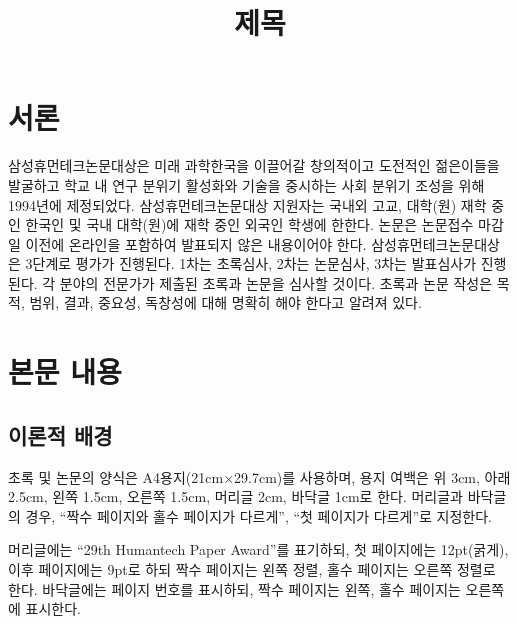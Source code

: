 \documentclass[kor]{humantech}
\title{제목} %
\begin{document}

\section{서론}
삼성휴먼테크논문대상은 미래 과학한국을 이끌어갈 창의적이고 도전적인 젊은이들을 발굴하고 학교 내 연구 분위기 활성화와 기술을 중시하는 사회 분위기 조성을 위해 1994년에 제정되었다. 삼성휴먼테크논문대상 지원자는 국내외 고교, 대학(원) 재학 중인 한국인 및 국내 대학(원)에 재학 중인 외국인 학생에 한한다. 논문은 논문접수 마감일 이전에 온라인을 포함하여 발표되지 않은 내용이어야 한다. 삼성휴먼테크논문대상은 3단계로 평가가 진행된다. 1차는 초록심사, 2차는 논문심사, 3차는 발표심사가 진행된다. 각 분야의 전문가가 제출된 초록과 논문을 심사할 것이다. 초록과 논문 작성은 목적, 범위, 결과, 중요성, 독창성에 대해 명확히 해야 한다고 알려져 있다.

\section{본문 내용}
\subsection{이론적 배경}
초록 및 논문의 양식은 A4용지(21cm×29.7cm)를 사용하며, 용지 여백은 위 3cm, 아래 2.5cm, 왼쪽 1.5cm, 오른쪽 1.5cm, 머리글 2cm, 바닥글 1cm로 한다. 머리글과 바닥글의 경우, ``짝수 페이지와 홀수 페이지가 다르게'', ``첫 페이지가 다르게''로 지정한다.

머리글에는 ``29th Humantech Paper Award''를 표기하되, 첫 페이지에는 12pt(굵게), 이후 페이지에는 9pt로 하되 짝수 페이지는 왼쪽 정렬, 홀수 페이지는 오른쪽 정렬로 한다. 바닥글에는 페이지 번호를 표시하되, 짝수 페이지는 왼쪽, 홀수 페이지는 오른쪽에 표시한다.
\end{document}
